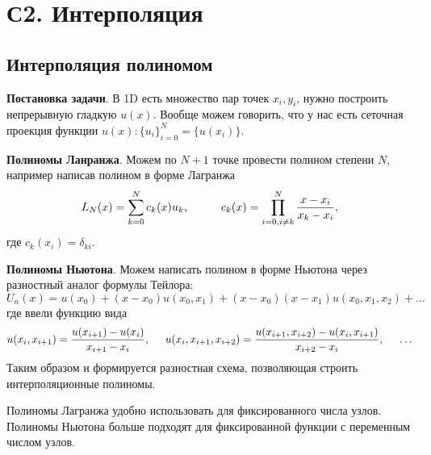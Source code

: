 \section{С2. Интерполяция}

\subsection*{Интерполяция полиномом}


\textbf{Постановка задачи}. В 1D есть множество пар точек ${x_i, y_i}$, нужно построить непрерывную гладкую $u(x)$. 
Вообще можем говорить, что у нас есть сеточная проекция функции $u(x) \colon  \{u_i\}_{i=0}^{N} = \{u(x_i)\}$.  


\textbf{Полиномы Ланранжа}. 
Можем по $N+1$ точке провести полином степени $N$, например написав полином в форме Лагранжа
\begin{equation}
	L_N (x) = \sum_{k=0}^{N} c_k (x) u_k,
	\hspace{10 mm} 
	c_k (x) = \prod_{i=0, i\neq k}^{N} \frac{x-x_i}{x_k-x_i},
\end{equation}
где $c_k (x_i) = \delta_{ki}$.

\textbf{Полиномы Ньютона}. 
Можем написать полином в форме Ньютона через разностный аналог формулы Тейлора:
\begin{equation}
	U_n (x) = u (x_0) + (x-x_0) u(x_0, x_1) + (x-x_0) (x-x_1) u(x_0,x_1, x_2) + \ldots
\end{equation}
где ввели функцию вида
\begin{equation}
	u(x_i, x_{i+1}) = \frac{u(x_{i+1}) - u(x_i)}{x_{i+1}-x_i},
	\hspace{5 mm} 
	u(x_i, x_{i+1}, x_{i+2}) = \frac{u(x_{i+1}, x_{i+2}) - u(x_i, x_{i+1})}{x_{i+2}-x_i}, \hspace{5 mm} \ldots
\end{equation}
Таким образом и формируется разностная схема, позволяющая строить интерполяционные полиномы. 

Полиномы Лагранжа удобно использовать для фиксированного числа узлов. Полиномы Ньютона больше подходят для фиксированной функции с переменным числом узлов.

